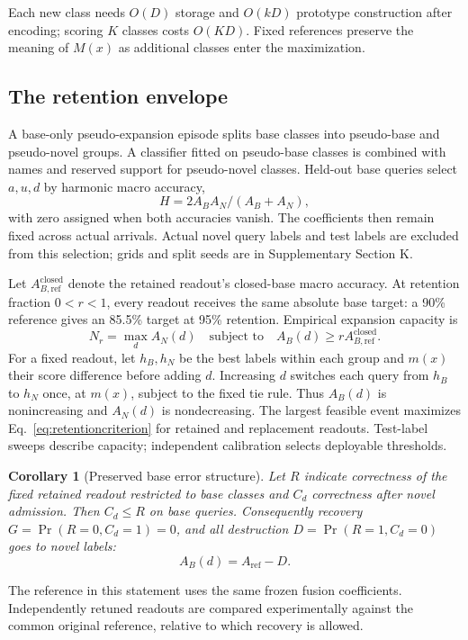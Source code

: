 \documentclass[preprint,review,12pt]{elsarticle}
\newtheorem{corollary}{Corollary}
\begin{document}
Each new class needs $O(D)$ storage and $O(kD)$ prototype construction after encoding; scoring $K$ classes costs $O(KD)$. Fixed references preserve the meaning of $M(x)$ as additional classes enter the maximization.

\subsection{The retention envelope}
\label{sec:calibration}
A base-only pseudo-expansion episode splits base classes into pseudo-base and pseudo-novel groups. A classifier fitted on pseudo-base classes is combined with names and reserved support for pseudo-novel classes. Held-out base queries select $a,u,d$ by harmonic macro accuracy,
\begin{equation}
 H=2A_BA_N/(A_B+A_N),
 \label{eq:harmonic}
\end{equation}
with zero assigned when both accuracies vanish. The coefficients then remain fixed across actual arrivals. Actual novel query labels and test labels are excluded from this selection; grids and split seeds are in Supplementary Section K.

Let $A_{B,\mathrm{ref}}^{\mathrm{closed}}$ denote the retained readout's closed-base macro accuracy. At retention fraction $0<r<1$, every readout receives the same absolute base target: a 90\% reference gives an 85.5\% target at 95\% retention. Empirical expansion capacity is
\begin{equation}
 N_r=\max_d A_N(d)\quad\text{subject to}\quad
 A_B(d)\geq rA_{B,\mathrm{ref}}^{\mathrm{closed}}.
 \label{eq:retentioncriterion}
\end{equation}
For a fixed readout, let $h_B,h_N$ be the best labels within each group and $m(x)$ their score difference before adding $d$. Increasing $d$ switches each query from $h_B$ to $h_N$ once, at $m(x)$, subject to the fixed tie rule. Thus $A_B(d)$ is nonincreasing and $A_N(d)$ is nondecreasing. The largest feasible event maximizes Eq.~\eqref{eq:retentioncriterion} for retained and replacement readouts. Test-label sweeps describe capacity; independent calibration selects deployable thresholds.

\begin{corollary}[Preserved base error structure]
Let $R$ indicate correctness of the fixed retained readout restricted to base classes and $C_d$ correctness after novel admission. Then $C_d\leq R$ on base queries. Consequently recovery $G=\Pr(R=0,C_d=1)=0$, and all destruction $D=\Pr(R=1,C_d=0)$ goes to novel labels:
\begin{equation}
 A_B(d)=A_{\mathrm{ref}}-D.
 \label{eq:retainederrors}
\end{equation}
\end{corollary}
The reference in this statement uses the same frozen fusion coefficients. Independently retuned readouts are compared experimentally against the common original reference, relative to which recovery is allowed.
\end{document}
